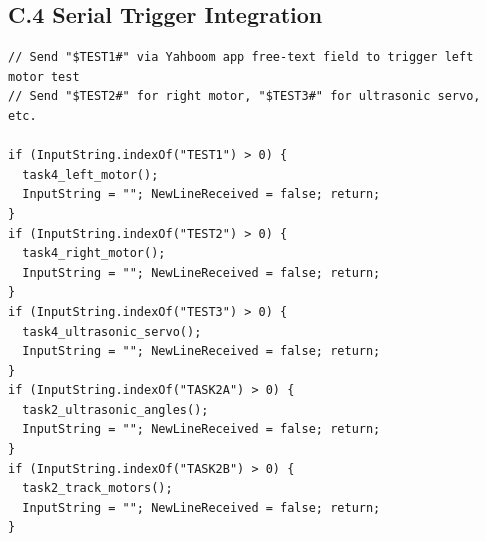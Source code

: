 \documentclass[12pt,a4paper]{article}
\begin{document}
\subsection*{C.4 \quad Serial Trigger Integration}

\begin{lstlisting}[style=arduino,caption={Serial trigger block --- add inside serial\_data\_parse()}]
// Send "$TEST1#" via Yahboom app free-text field to trigger left motor test
// Send "$TEST2#" for right motor, "$TEST3#" for ultrasonic servo, etc.

if (InputString.indexOf("TEST1") > 0) {
  task4_left_motor();
  InputString = ""; NewLineReceived = false; return;
}
if (InputString.indexOf("TEST2") > 0) {
  task4_right_motor();
  InputString = ""; NewLineReceived = false; return;
}
if (InputString.indexOf("TEST3") > 0) {
  task4_ultrasonic_servo();
  InputString = ""; NewLineReceived = false; return;
}
if (InputString.indexOf("TASK2A") > 0) {
  task2_ultrasonic_angles();
  InputString = ""; NewLineReceived = false; return;
}
if (InputString.indexOf("TASK2B") > 0) {
  task2_track_motors();
  InputString = ""; NewLineReceived = false; return;
}
\end{lstlisting}

\newpage
\end{document}
